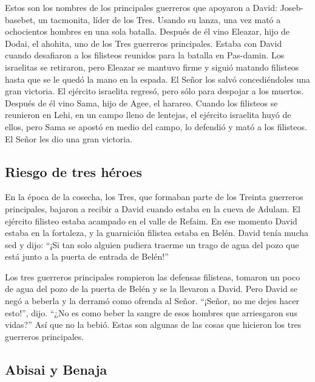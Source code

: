  Estos son los nombres de los principales guerreros que
apoyaron a David: Joseb-basebet, un tacmonita, líder de los Tres. Usando
su lanza, una vez mató a ochocientos hombres en una sola batalla.
 Después de él vino Eleazar, hijo de Dodai, el ahohita,
uno de los Tres guerreros principales. Estaba con David cuando
desafiaron a los filisteos reunidos para la batalla en Pas-damin. Los
israelitas se retiraron,  pero Eleazar se mantuvo firme y
siguió matando filisteos hasta que se le quedó la mano en la espada. El
Señor los salvó concediéndoles una gran victoria. El ejército israelita
regresó, pero sólo para despojar a los muertos.  Después
de él vino Sama, hijo de Agee, el harareo. Cuando los filisteos se
reunieron en Lehi, en un campo lleno de lentejas, el ejército israelita
huyó de ellos,  pero Sama se apostó en medio del campo,
lo defendió y mató a los filisteos. El Señor les dio una gran victoria.

\hypertarget{riesgo-de-tres-huxe9roes}{%
\subsection{Riesgo de tres héroes}\label{riesgo-de-tres-huxe9roes}}

 En la época de la cosecha, los Tres, que formaban parte
de los Treinta guerreros principales, bajaron a recibir a David cuando
estaba en la cueva de Adulam. El ejército filisteo estaba acampado en el
valle de Refaim.  En ese momento David estaba en la
fortaleza, y la guarnición filistea estaba en Belén. 
David tenía mucha sed y dijo: ``¡Si tan solo alguien pudiera traerme un
trago de agua del pozo que está junto a la puerta de entrada de Belén!''

 Los tres guerreros principales rompieron las defensas
filisteas, tomaron un poco de agua del pozo de la puerta de Belén y se
la llevaron a David. Pero David se negó a beberla y la derramó como
ofrenda al Señor.  ``¡Señor, no me dejes hacer esto!'',
dijo. ``¿No es como beber la sangre de esos hombres que arriesgaron sus
vidas?'' Así que no la bebió. Estas son algunas de las cosas que
hicieron los tres guerreros principales.

\hypertarget{abisai-y-benaja}{%
\subsection{Abisai y Benaja}\label{abisai-y-benaja}}

